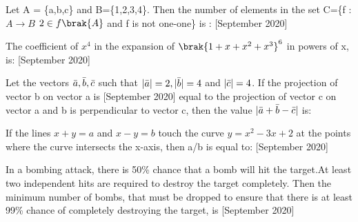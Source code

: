 \iffalse
\title{2020}
\author{EE24BTECH11063}
\section{integer}
\fi
\item Let A = \{a,b,c\} and B=\{1,2,3,4\}. Then the number of elements in the set C=\{f : $A \rightarrow B$ $2 \in f\brak{A}$ and f is not one-one\} is :  \hfill{[September 2020]}
 \item The coefficient of $x^4$ in the expansion of $\brak{1+x+x^2+x^3}^6$ in powers of x, is:  \hfill{[September 2020]}
 \item Let the vectors $\Bar{a},\Bar{b},\Bar{c}$ such that $|\Bar{a}|=2,|\Bar{b}|=4$ and $|\Bar{c}|=4$. If the projection of vector b on vector a is \hfill{[September 2020]} equal to the projection of vector c on vector a and b is perpendicular to vector c, then the value $|\Bar{a}+\Bar{b}-\Bar{c}|$ is:
 \item If the lines $x+y=a$ and $x-y=b$ touch the curve $y=x^2-3x+2$ at the points where the curve intersects the x-axis, then a/b is equal to: \hfill{[September 2020]}
 \item In a bombing attack, there is 50\% chance that a bomb will hit the target.At least two independent hits are required to destroy the target completely. Then the minimum number of bombs, that must be dropped to ensure that there is at least 99\% chance of completely destroying the target, is \hfill{[September 2020]}
